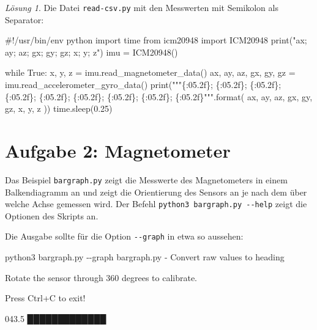 \documentclass[
  11pt,
  a4paper,
  oneside, openany  ,captions=tableheading
]{scrbook}
\newenvironment{Shaded}{\begin{snugshade}}{\end{snugshade}}
\newcommand{\AttributeTok}[1]{\textcolor[rgb]{0.40,0.45,0.13}{#1}}
\newcommand{\BuiltInTok}[1]{\textcolor[rgb]{0.00,0.23,0.31}{#1}}
\newcommand{\CommentTok}[1]{\textcolor[rgb]{0.37,0.37,0.37}{#1}}
\newcommand{\ControlFlowTok}[1]{\textcolor[rgb]{0.00,0.23,0.31}{#1}}
\newcommand{\ExtensionTok}[1]{\textcolor[rgb]{0.00,0.23,0.31}{#1}}
\newcommand{\FloatTok}[1]{\textcolor[rgb]{0.68,0.00,0.00}{#1}}
\newcommand{\ImportTok}[1]{\textcolor[rgb]{0.00,0.46,0.62}{#1}}
\newcommand{\NormalTok}[1]{\textcolor[rgb]{0.00,0.23,0.31}{#1}}
\newcommand{\OperatorTok}[1]{\textcolor[rgb]{0.37,0.37,0.37}{#1}}
\newcommand{\SpecialCharTok}[1]{\textcolor[rgb]{0.37,0.37,0.37}{#1}}
\newcommand{\StringTok}[1]{\textcolor[rgb]{0.13,0.47,0.30}{#1}}
\newcommand{\VariableTok}[1]{\textcolor[rgb]{0.07,0.07,0.07}{#1}}
\theoremstyle{remark}
\newtheorem*{solution}{Lösung}
\renewcommand{\markright}[1]{\def\chaptertitle{#1}} %
\begin{document}
\begin{solution}
Die Datei \texttt{read-csv.py} mit den Messwerten mit Semikolon als
Separator:

\begin{Shaded}
\begin{Highlighting}[]
\CommentTok{\#!/usr/bin/env python}
\ImportTok{import}\NormalTok{ time}
\ImportTok{from}\NormalTok{ icm20948 }\ImportTok{import}\NormalTok{ ICM20948}
\BuiltInTok{print}\NormalTok{(}\StringTok{"ax; ay; az; gx; gy; gz; x; y; z"}\NormalTok{)}
\NormalTok{imu }\OperatorTok{=}\NormalTok{ ICM20948()}

\ControlFlowTok{while} \VariableTok{True}\NormalTok{:}
\NormalTok{    x, y, z }\OperatorTok{=}\NormalTok{ imu.read\_magnetometer\_data()}
\NormalTok{    ax, ay, az, gx, gy, gz }\OperatorTok{=}\NormalTok{ imu.read\_accelerometer\_gyro\_data()}
    \BuiltInTok{print}\NormalTok{(}\StringTok{"""}\SpecialCharTok{\{:05.2f\}}\StringTok{; }\SpecialCharTok{\{:05.2f\}}\StringTok{; }\SpecialCharTok{\{:05.2f\}}\StringTok{; }\SpecialCharTok{\{:05.2f\}}\StringTok{; }\SpecialCharTok{\{:05.2f\}}\StringTok{; }\SpecialCharTok{\{:05.2f\}}\StringTok{; }\SpecialCharTok{\{:05.2f\}}\StringTok{; }\SpecialCharTok{\{:05.2f\}}\StringTok{; }\SpecialCharTok{\{:05.2f\}}\StringTok{"""}\NormalTok{.}\BuiltInTok{format}\NormalTok{(}
\NormalTok{        ax, ay, az, gx, gy, gz, x, y, z ))}
\NormalTok{    time.sleep(}\FloatTok{0.25}\NormalTok{)}
\end{Highlighting}
\end{Shaded}

\end{solution}

\section*{Aufgabe 2: Magnetometer}\label{aufgabe-2-magnetometer}

\markright{Aufgabe 2: Magnetometer}

Das Beispiel \texttt{bargraph.py} zeigt die Messwerte des Magnetometers
in einem Balkendiagramm an und zeigt die Orientierung des Sensors an je
nach dem über welche Achse gemessen wird. Der Befehl
\texttt{python3\ bargraph.py\ -\/-help} zeigt die Optionen des Skripts
an.

Die Ausgabe sollte für die Option \texttt{-\/-graph} in etwa so
aussehen:

\begin{Shaded}
\begin{Highlighting}[]
\ExtensionTok{python3}\NormalTok{ bargraph.py }\AttributeTok{{-}{-}graph}
\ExtensionTok{bargraph.py} \AttributeTok{{-}}\NormalTok{ Convert raw values to heading}

\ExtensionTok{Rotate}\NormalTok{ the sensor through 360 degrees to calibrate.}

\ExtensionTok{Press}\NormalTok{ Ctrl+C to exit!}

\ExtensionTok{043.5}\NormalTok{ █████████████                                                                                                     }
\end{Highlighting}
\end{Shaded}
\end{document}
